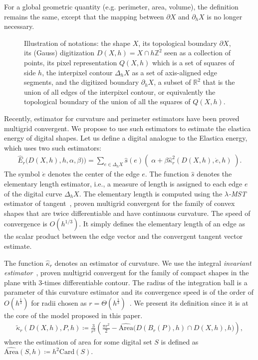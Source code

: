 \documentclass[review]{siamart220329}
\newcommand{\R}{\mathbb{R}}
\newcommand{\Z}{\mathbb{Z}}
\begin{document}
For a global geometric quantity (e.g. perimeter, area, volume), the definition remains the same, except that the mapping
between $\partial X$ and $\partial_h X$ is no longer necessary.

\begin{figure}
  
  \caption{Illustration of notations: the shape $X$, its topological boundary $\partial X$, its (Gauss) digitization $D(X,h)=X \cap h \Z^2$ seen as a collection of points, its pixel representation $Q(X,h)$ which is a set of squares of side $h$, the interpixel contour $\Delta_h X$ as a set of axis-aligned edge segments, and the digitized boundary $\partial_h X$, a subset of $\R^2$ that is the union of all edges of the interpixel contour, or equivalently the topological boundary of the union of all the squares of $Q(X,h)$.\label{fig-notations}}
\end{figure}

Recently, estimator for curvature and perimeter estimators have been proved multigrid convergent. We propose to use such estimators to estimate the elastica energy of digital shapes. Let us define a digital analogue to the Elastica energy, which uses two such estimators:
%
%
\begin{align}
	\hat{E}_r\big( D(X,h),h,\alpha,\beta) \big) = \sum_{e \in \Delta_h X}{ \hat{s}(e)\left(\; \alpha + \beta \hat{\kappa}_{r}^2(D(X,h),\dot{e},h) \; \right)}.
	\label{eq:digital-energy}
\end{align}
%
%
The symbol $\dot{e}$ denotes the center of the edge $e$.  The
function $\hat{s}$ denotes the elementary length estimator, i.e., a
measure of length is assigned to each edge $e$ of the digital curve
$\Delta_h X$. The elementary length is computed using the
\emph{$\lambda$-MST} estimator of
tangent~\cite{lachaud07tangent,lachaud06hdr}, proven multigrid
convergent for the family of convex shapes that are twice
differentiable and have continuous curvature. The speed of convergence
is $O(h^{1/3})$. It simply defines the elementary
  length of an edge as the scalar product between the edge vector and
  the convergent tangent vector estimate.

The function $\hat{\kappa} _r$ denotes an estimator of curvature. We use the integral \emph{invariant estimator}~\cite{coeurjolly13integral}, proven multigrid convergent for the family of compact shapes in the plane with $3$-times differentiable contour. The radius of the integration ball is a parameter of this curvature estimator and its convergence speed is of the order of $O(h^{\frac{1}{3}})$ for radii chosen as $r=\Theta (h^{\frac{1}{3}})$~\cite{lachaud2017robust}. We present its definition since it is at the core of the model proposed in this paper.
%
%
\begin{align}
  \tilde{\kappa}_r(D(X,h),P,h) \coloneqq \frac{3}{r^3}\left( \frac{\pi r^2}{2} - \widehat{\text{Area}}\big( D(B_r(P),h) \cap D(X,h),h\big) \right),
  \label{eq:curvature_approximation}
\end{align}
%
%
where the estimation of area for some digital set $S$ is defined as $\widehat{\text{Area}}(S,h) \coloneqq h^2\text{Card}\left( S \right).$ 
\end{document}
